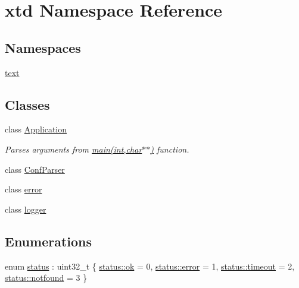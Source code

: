 \hypertarget{namespacextd}{\section{xtd Namespace Reference}
\label{namespacextd}
}
\subsection*{Namespaces}
\begin{DoxyCompactItemize}
\item 
\hyperlink{namespacextd_1_1text}{text}
\end{DoxyCompactItemize}
\subsection*{Classes}
\begin{DoxyCompactItemize}
\item 
class \hyperlink{classxtd_1_1Application}{Application}
\begin{DoxyCompactList}\small\item\em Parses arguments from \hyperlink{doc_2example_2Application_8hh_a6b77b2233054447db17959182b5fb02b}{main(int,char$\ast$$\ast$)} function. \end{DoxyCompactList}\item 
class \hyperlink{classxtd_1_1ConfParser}{Conf\-Parser}
\item 
class \hyperlink{classxtd_1_1error}{error}
\item 
class \hyperlink{classxtd_1_1logger}{logger}
\end{DoxyCompactItemize}
\subsection*{Enumerations}
\begin{DoxyCompactItemize}
\item 
enum \hyperlink{namespacextd_a68ed4fe8e9c11116b68efe5b102aec50}{status} \-: uint32\-\_\-t \{ \hyperlink{namespacextd_a68ed4fe8e9c11116b68efe5b102aec50a444bcb3a3fcf8389296c49467f27e1d6}{status\-::ok} = 0, 
\hyperlink{namespacextd_a68ed4fe8e9c11116b68efe5b102aec50acb5e100e5a9a3e7f6d1fd97512215282}{status\-::error} = 1, 
\hyperlink{namespacextd_a68ed4fe8e9c11116b68efe5b102aec50a90272dda245ae1fb3cf197e91a8689dc}{status\-::timeout} = 2, 
\hyperlink{namespacextd_a68ed4fe8e9c11116b68efe5b102aec50ac2adf6ecc220f2711801d6e466340183}{status\-::notfound} = 3
 \}
\end{DoxyCompactItemize}
